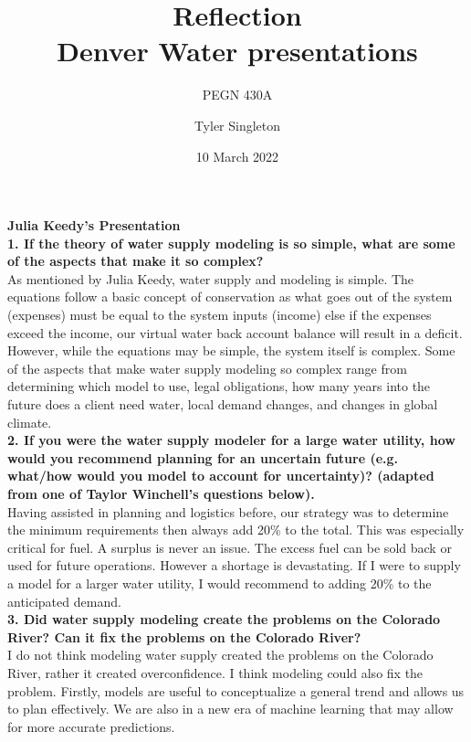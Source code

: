 \documentclass[12pt]{article}
\title{Reflection\\
Denver Water presentations}
\subtitle{PEGN 430A}
\author{Tyler Singleton}
\date{10 March 2022}
\begin{document}
\maketitle

\newpage
\setlength{\parindent}{0pt}

\textbf{Julia Keedy's Presentation} \\

\textbf{1. If the theory of water supply modeling is so simple, what are some of the aspects that make it so complex?} \\

As mentioned by Julia Keedy, water supply and modeling is simple. The equations follow a basic concept of conservation as what goes out of the system (expenses) must be equal to the system inputs (income) else if the expenses exceed the income, our virtual water back account balance will result in a deficit. However, while the equations may be simple, the system itself is complex. Some of the aspects that make water supply modeling so complex range from determining which model to use, legal obligations, how many years into the future does a client need water, local demand changes, and changes in global climate. \\

\textbf{2. If you were the water supply modeler for a large water utility, how would you recommend planning for an uncertain future (e.g. what/how would you model to account for uncertainty)? (adapted from one of Taylor Winchell’s questions below).} \\

Having assisted in planning and logistics before, our strategy was to determine the minimum requirements then always add 20\% to the total. This was especially critical for fuel. A surplus is never an issue. The excess fuel can be sold back or used for future operations. However a shortage is devastating. If I were to supply a model for a larger water utility, I would recommend to adding 20\% to the anticipated demand. \\

\textbf{3. Did water supply modeling create the problems on the Colorado River? Can it fix the problems on the Colorado River?} \\

I do not think modeling water supply created the problems on the Colorado River, rather it created overconfidence. I think modeling could also fix the problem. Firstly, models are useful to conceptualize a general trend and allows us to plan effectively. We are also in a new era of machine learning that may allow for more accurate predictions. \\
\end{document}
